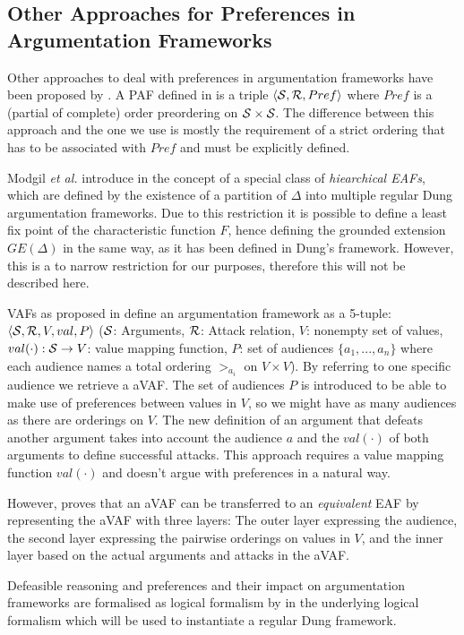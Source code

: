 \subsection{Other Approaches for Preferences in Argumentation Frameworks}
\label{app:other_afs}
\label{sub:paf}
Other approaches to deal with preferences in argumentation frameworks have been proposed by \cite{amgoud,amgoud1998,Bench2003,pollock1987, prakken1997}. A \gls{PAF} defined in \cite{amgoud1998} is  a triple $\langle \S, \R, Pref \rangle$ where $Pref$ is a (partial of complete) order preordering on $\S \times \S$. The difference between this approach and the one we use is mostly the requirement of a strict ordering that has to be associated with $Pref$ and must be explicitly defined.

Modgil \textit{et al.} introduce in \cite{Modgil2009} the concept of a special class of \textit{hiearchical \glspl{EAF}}, which are defined by the existence of a partition of $\Delta$ into multiple regular Dung argumentation frameworks. Due to this restriction it is possible to define a least fix point of the characteristic function $F$, hence defining the grounded extension $GE(\Delta)$ in the same way, as it has been defined in Dung's framework. However, this is a to narrow restriction for our purposes, therefore this will not be described here. 

\label{sub:vaf}

\Glspl{VAF} as proposed in \cite{Bench2003} define an argumentation framework as a 5-tuple: $\langle \S, \R, V, val, P \rangle$ ($\S$: Arguments, $\R$: Attack relation, $V$: nonempty set of values, $val(\cdot): \S \rightarrow V$: value mapping function, $P$: set of audiences $\{a_1, ..., a_n\}$ where each audience names a total ordering $>_{a_i}$ on $V \times V$). By referring to one specific audience we retrieve a \gls{aVAF}. The set of audiences $P$ is introduced to be able to make use of preferences between values in $V$, so we might have as many audiences as there are orderings on $V$. The new definition of an argument that defeats another argument takes into account the audience $a$ and the $val(\cdot)$ of both arguments to define successful attacks. This approach requires a value mapping function $val(\cdot)$ and doesn't argue with preferences in a natural way. 

However, \cite{Modgil2009} proves that an \gls{aVAF} can be transferred to an \textit{equivalent} \gls{EAF} by representing the \gls{aVAF} with three layers: The outer layer expressing the audience, the second layer expressing the pairwise orderings on values in $V$, and the inner layer based on the actual arguments and attacks in the \gls{aVAF}.

Defeasible reasoning and preferences and their impact on argumentation frameworks are formalised as logical formalism by \cite{pollock1987, prakken1997} in the underlying logical formalism which will be used to instantiate a regular Dung framework.